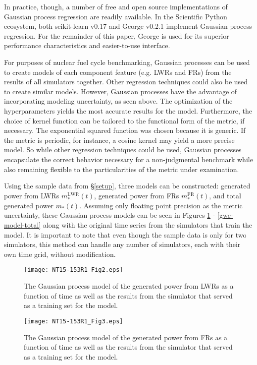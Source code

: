 \documentclass{ntmanuscript}
\newcommand{\LWR}{\mathrm{LWR}}
\newcommand{\FR}{\mathrm{FR}}
\begin{document}
In practice, though, a number of free and open source implementations of Gaussian
process regression are readily available. In the Scientific Python ecosystem, both
scikit-learn v0.17 \cite{scikit-learn} and George v0.2.1 \cite{hodlr} implement
Gaussian process regression. For the remainder of this paper, George is used
for its superior performance characteristics and easier-to-use interface.

For purposes of nuclear fuel cycle benchmarking, Gaussian processes can be used to
create models of each component feature (e.g. LWRs and FRs) from the
results of all simulators together. Other regression techniques could also be used
to create similar models.  However, Gaussian processes have the advantage of
incorporating modeling uncertainty, as seen above. The optimization of the
hyperparameters yields the most accurate results for the model. Furthermore, the
choice of kernel function can be tailored to the functional form of the metric, if
necessary. The exponential squared function was chosen because it is generic. If the
metric is periodic, for instance, a cosine kernel may yield a more precise model.
So while other regression techniques could be used, Gaussian processes
encapsulate the correct behavior necessary for a non-judgmental benchmark while
also remaining flexible to the particularities of the metric under examination.

Using the sample data from \S\ref{setup}, three models can be constructed:
generated power from LWRs $m_*^{\LWR}(t)$, generated power from FRs $m_*^{\FR}(t)$,
and total generated power $m_*(t)$. Assuming only floating point precision as
the metric uncertainty, these Gaussian process models can be seen in Figures
\ref{gwe-model-lwr} - \ref{gwe-model-total} along with the original time series
from the simulators that train the model.
It is important to note that even though the sample data is only for two simulators,
this method can handle any number of simulators, each with their own time grid,
without modification.

\begin{figure}[htb]
\centering
\texttt{[image: NT15-153R1\_Fig2.eps]}
\caption{The Gaussian process model of the generated power from LWRs
as a function of time as well as the results from the simulator that served as a
training set for the model.}
\label{gwe-model-lwr}
\end{figure}

\begin{figure}[htb]
\centering
\texttt{[image: NT15-153R1\_Fig3.eps]}
\caption{The Gaussian process model of the generated power from FRs
as a function of time as well as the results from the simulator that served as a
training set for the model.}
\label{gwe-model-fr}
\end{figure}
\end{document}
